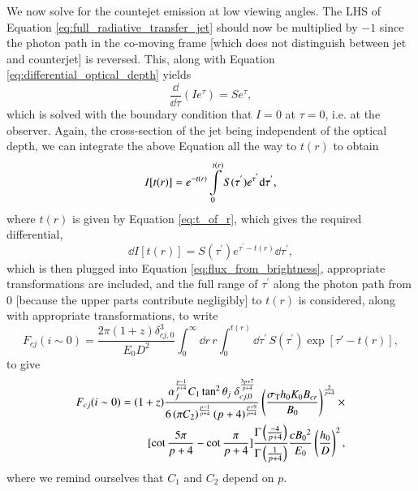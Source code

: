 We now solve for the countejet emission at low viewing angles. The LHS of Equation \ref{eq:full_radiative_transfer_jet} should now be multiplied by $-1$ since the photon path in the co-moving frame [which does not distinguish between jet and counterjet] is reversed. This, along with Equation \ref{eq:differential_optical_depth} yields
\begin{equation}
\dfrac{\dd}{\dd \tau}(I e^{\tau}) = S e^{\tau},
\label{eq:radiative_transfer_equation_for_counterjet}
\end{equation}
which is solved with the boundary condition that $I = 0$ at $\tau = 0$, i.e. at the observer. Again, the cross-section of the jet being independent of the optical depth, we can integrate the above Equation all the way to $t(r)$ to obtain
\begin{equation}
I[t(r)] = e^{-t(r)} \intop_{0}^{t(r)} S(\tau^{'}) e^{\tau^{'}} \dd \tau^{'},
\label{eq:brightness_profile_of_counterjet}
\end{equation}
where $t(r)$ is given by Equation \ref{eq:t_of_r}, which gives the required differential,
\begin{equation}
\dd I[t(r)] = S(\tau^{'}) e^{\tau^{'} - t(r)} \dd \tau^{'},
\end{equation}
which is then plugged into Equation  \ref{eq:flux_from_brightness}, appropriate transformations are included, and the full range of $ \tau^{'} $ along the photon path from $0$ [because the upper parts contribute negligibly] to $t(r)$ is considered, along with appropriate transformations, to write
\begin{equation}
F_{cj} (i \sim 0) = \dfrac{2 \pi (1+z) \delta_{cj,0}^3}{E_0 D^2} \int_{0}^{\infty} \dd r \, r \int_{0}^{t(r)} \dd \tau^{'} \, S(\tau^{'}) \exp[\tau'-t(r)],
\label{eq:counterjet_flux_integral}
\end{equation}
to give
\begin{equation}
\begin{split}
F_{cj} (i \sim 0) = (1+z) \dfrac{ \alpha_f^{\frac{p-1}{p+4} } C_1 \tan ^2 \theta_j \; \delta_{cj,0}^{\frac{3p+7}{p+4}} }{ 6 \left(\pi C_2 \right)^{\frac{p-1}{p+4}} (p+4)^{\frac{p+9}{p+4}} }\left(\dfrac{ \sigma_{\rm{T}} h_0 K_0 B_{cr}}{B_0}\right)^{\frac{5}{p+4}} \times \\ [ \cot\frac{5\pi}{p+4} - \cot\frac{\pi}{p+4} ] \dfrac{\Gamma\left(\frac{-4}{p+4}\right)}{\Gamma\left(\frac{1}{p+4}\right)} \frac{ c B_0{^2} }{E_0} \left(\frac{h_0}{D}\right)^2,
\end{split}
\label{eq:Flux_counterjet_on_axis}
\end{equation}
where we remind ourselves that $C_1$ and $C_2$ depend on $p$.

